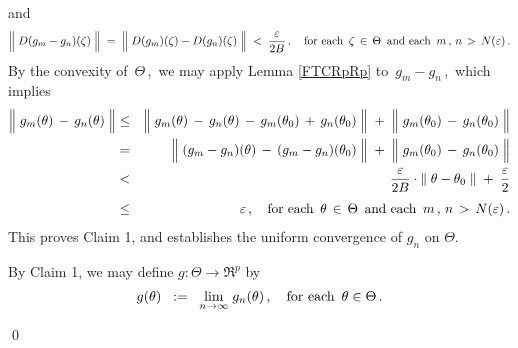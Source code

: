 and
\begin{equation*}
\left\Vert\; D(g_{m} \overset{{\color{white}.}}{-} g_{n})(\zeta) \;\right\Vert
\; = \;
	\left\Vert\;D(g_{m})(\zeta) \overset{{\color{white}.}}{-} D(g_{n})(\zeta)\;\right\Vert
\; < \;
	\dfrac{\varepsilon}{2 B}\,,
\quad
\textnormal{for each \,$\zeta \,\in\, \Theta$\, and each \,$m\,,\,n \,>\, N(\varepsilon)$}\,.
\end{equation*}
By the convexity of \,$\Theta$\,,\, we may apply Lemma \ref{FTCRpRp} to \,$g_{m} - g_{n}$\,,\,
which implies
\begin{eqnarray*}
\left\Vert\; g_{m}(\theta) \,\overset{{\color{white}.}}{-}\, g_{n}(\theta) \;\right\Vert
& \leq &
	\left\Vert\; g_{m}(\theta) \,\overset{{\color{white}.}}{-}\, g_{n}(\theta) \, - \, g_{m}(\theta_{0}) \,+\, g_{n}(\theta_{0}) \;\right\Vert
	\; + \;
	\left\Vert\; g_{m}(\theta_{0}) \,\overset{{\color{white}.}}{-}\, g_{n}(\theta_{0}) \;\right\Vert
\\
& = &
	\left\Vert\; (g_{m} - g_{n})(\theta) \,\overset{{\color{white}.}}{-}\, (g_{m} - g_{n})(\theta_{0}) \;\right\Vert
	\; + \;
	\left\Vert\; g_{m}(\theta_{0}) \,\overset{{\color{white}.}}{-}\, g_{n}(\theta_{0}) \;\right\Vert
\\
& < &
	\dfrac{\varepsilon}{2 B} \cdot \left\Vert\; \theta - \theta_{0} \;\right\Vert
	\; + \;
	\dfrac{\varepsilon}{2}
\\
& \leq &
	\overset{{\color{white}1}}{\varepsilon}\,,
	\quad
	\textnormal{for each \,$\theta \,\in\, \Theta$\, and each \,$m\,,\,n \,>\, N(\varepsilon)$}\,.
\end{eqnarray*}
This proves Claim 1, and establishes the uniform convergence of $g_{n}$ on $\Theta$.

\vskip 0.5cm
\noindent
By Claim 1, we may define $g : \Theta \longrightarrow \Re^{p}$ by
\begin{equation*}
g(\theta)
\;\; := \;\;
	\underset{n\rightarrow\infty}{\lim}\; g_{n}(\theta)\,,
\quad
\textnormal{for each \,$\theta \in \Theta$}\,.
\end{equation*}

\qed


